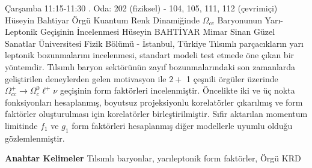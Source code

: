 
    \begin{abstract_basarim}
    {Çarşamba 11:15-11:30}
    {.}
    {Oda: 202 (fiziksel) - 104, 105, 111, 112 (çevrimiçi)}
    {Hüseyin Bahtiyar}
    {Örgü Kuantum Renk Dinamiğinde $\Omega_{c c}$ Baryonunun Yarı-Leptonik Geçişinin İncelenmesi}
    {%
    Hüseyin BAHTİYAR}
    {%
    }
    {%
    Mimar Sinan Güzel Sanatlar Üniversitesi Fizik Bölümü - İstanbul, Türkiye}
    Tılsımlı parçacıkların yarı leptonik bozunmalarını incelenmesi, standart modeli test etmede öne çıkan bir yöntemdir. Tılsımlı baryon sektörünün zayıf bozunmalarındaki son zamanlarda geliştirilen deneylerden gelen motivasyon ile $2+$ 1 çeşnili örgüler üzerinde $\Omega_{c c}^{+} \rightarrow \Omega_{c}^{0} \ell^{+} \nu$ geçişinin form faktörleri incelenmiştir. Öncelikte iki ve üç nokta fonksiyonları hesaplanmış, boyutsuz projeksiyonlu korelatörler çıkarılmış ve form faktörler oluşturulması için korelatörler birleştirilmiştir. Sıfir aktarılan momentum limitinde $f_{1}$ ve $g_{1}$ form faktörleri hesaplanmış diğer modellerle uyumlu olduğu gözlemlenmiştir. 
    
            \textbf{Anahtar Kelimeler} \newline{}Tılsımlı baryonlar, yarıleptonik form faktörler, Örgü KRD
    \end{abstract_basarim}
    